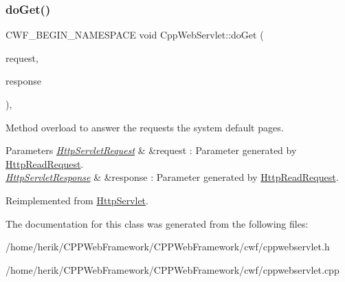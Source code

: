 \subsubsection{\texorpdfstring{do\+Get()}{doGet()}}
{\footnotesize\ttfamily C\+W\+F\+\_\+\+B\+E\+G\+I\+N\+\_\+\+N\+A\+M\+E\+S\+P\+A\+CE void Cpp\+Web\+Servlet\+::do\+Get (\begin{DoxyParamCaption}\item[{\hyperlink{class_http_servlet_request}{Http\+Servlet\+Request} \&}]{request,  }\item[{\hyperlink{class_http_servlet_response}{Http\+Servlet\+Response} \&}]{response }\end{DoxyParamCaption})\hspace{0.3cm}{\ttfamily [override]}, {\ttfamily [virtual]}}



Method overload to answer the requests the system default pages. 


\begin{DoxyParams}{Parameters}
{\em \hyperlink{class_http_servlet_request}{Http\+Servlet\+Request}} & \&request \+: Parameter generated by \hyperlink{class_http_read_request}{Http\+Read\+Request}. \\
\hline
{\em \hyperlink{class_http_servlet_response}{Http\+Servlet\+Response}} & \&response \+: Parameter generated by \hyperlink{class_http_read_request}{Http\+Read\+Request}. \\
\hline
\end{DoxyParams}


Reimplemented from \hyperlink{class_http_servlet_ab070be0f8d3e60751475eb9f0801ae15}{Http\+Servlet}.



The documentation for this class was generated from the following files\+:\begin{DoxyCompactItemize}
\item 
/home/herik/\+C\+P\+P\+Web\+Framework/\+C\+P\+P\+Web\+Framework/cwf/cppwebservlet.\+h\item 
/home/herik/\+C\+P\+P\+Web\+Framework/\+C\+P\+P\+Web\+Framework/cwf/cppwebservlet.\+cpp\end{DoxyCompactItemize}
